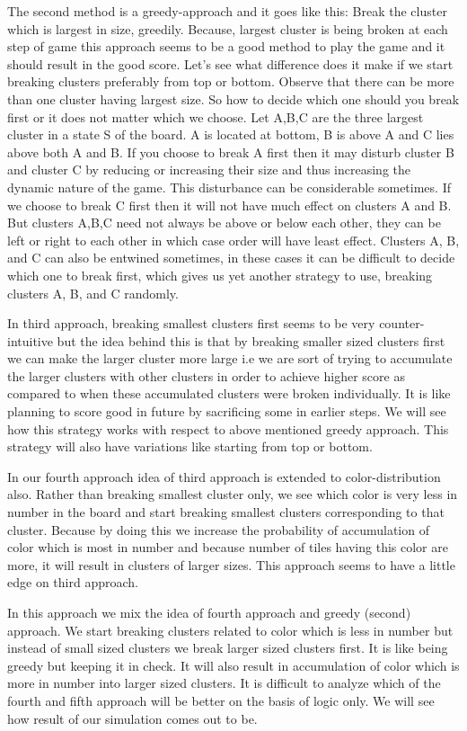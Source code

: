 \documentclass[twoside]{article}
\begin{document}
\begin{multicols}{2}
The second method is a greedy-approach and it goes like this: Break the cluster which is largest in size, greedily. Because, 
largest cluster is being broken at each step of game this approach seems to be a good method
to play the game and it should result in the good score. Let's see what difference does it make if we start breaking clusters
preferably from top or bottom. Observe that there can be more than one cluster having largest size. So how to decide which one 
should you break first or it does not matter which we choose. Let A,B,C are the three largest cluster in a state S of the board.
A is located at bottom, B is above A and C lies above both A and B. If you choose to break A first then it may disturb cluster B and
cluster C by reducing or increasing their size and thus increasing the dynamic nature of the game. This disturbance can be 
considerable sometimes. If we choose to break C first then it will not have much effect on clusters A and B. But clusters A,B,C 
need not always be above or below each other, they can be left or right to each other in which case order will have least effect. 
Clusters A, B, and C can also be entwined sometimes, in these cases it can be difficult to decide which one to break first, which 
gives us yet another strategy to use, breaking clusters A, B, and C randomly.

In third approach, breaking smallest clusters first seems to be very counter-intuitive but the idea behind this is that by breaking 
smaller sized clusters first we can make the larger cluster more large i.e we are sort of trying to accumulate the larger clusters
with other clusters in order to achieve higher score as compared to when these accumulated clusters were broken individually. It is
like planning to score good in future by sacrificing some in earlier steps. We will see how this strategy works with respect to above
mentioned greedy approach. This strategy will also have variations like starting from top or bottom.

In our fourth approach idea of third approach is extended to color-distribution also. Rather than breaking smallest cluster only,
we see which color is very less in number in the board and start breaking smallest clusters corresponding to that cluster. Because by 
doing this we increase the probability of accumulation of color which is most in number and because number of tiles having this
color are more, it will result in clusters of larger sizes. This approach seems to have a little edge on third approach.

In this approach we mix the idea of fourth approach and greedy (second) approach. We start breaking clusters related to color which
is less in number but instead of small sized clusters we break larger sized clusters first. It is like being greedy but keeping it 
in check. It will also result in accumulation of color which is more in number into larger sized clusters. It is difficult to analyze
which of the fourth and fifth approach will be better on the basis of logic only. We will see how result of our simulation comes out
to be.


\end{multicols}
\end{document}
